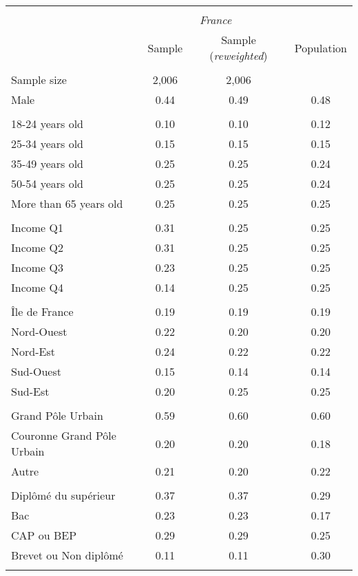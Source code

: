 \begin{tabular}{lccc}
\toprule
\hline \\[-1.8ex]
\multicolumn{1}{c}{\em{ }} & \multicolumn{2}{c}{\em{France}}\\
\cmidrule(l{3pt}r{3pt}){2-3}
\noalign{\smallskip}  & Sample & Sample (\textit{reweighted}) & Population\\
\hline \\[-1.8ex] 
Sample size & 2,006 & 2,006 &  \\
\noalign{\smallskip}\hline \noalign{\smallskip}Male & 0.44 & 0.49 & 0.48\\ 
\\
18-24 years old & 0.10 & 0.10 & 0.12\\
25-34 years old & 0.15 & 0.15 & 0.15\\
35-49 years old & 0.25 & 0.25 & 0.24\\
50-54 years old & 0.25 & 0.25 & 0.24\\
More than 65 years old & 0.25 & 0.25 & 0.25\\ 
\\
Income Q1 & 0.31 & 0.25 & 0.25\\
Income Q2 & 0.31 & 0.25 & 0.25\\
Income Q3 & 0.23 & 0.25 & 0.25\\
Income Q4 & 0.14 & 0.25 & 0.25\\
\\
Île de France & 0.19 & 0.19 & 0.19\\
Nord-Ouest & 0.22 & 0.20 & 0.20\\
Nord-Est & 0.24 & 0.22 & 0.22\\
Sud-Ouest & 0.15 & 0.14 & 0.14\\
Sud-Est & 0.20 & 0.25 & 0.25\\
\\
Grand Pôle Urbain & 0.59 & 0.60 & 0.60\\
Couronne Grand Pôle Urbain & 0.20 & 0.20 & 0.18\\
Autre & 0.21 & 0.20 & 0.22\\
\\
Diplômé du supérieur & 0.37 & 0.37 & 0.29\\
Bac & 0.23 & 0.23 & 0.17\\
CAP ou BEP & 0.29 & 0.29 & 0.25\\
Brevet ou Non diplômé & 0.11 & 0.11 & 0.30\\
\\
\bottomrule
\end{tabular}